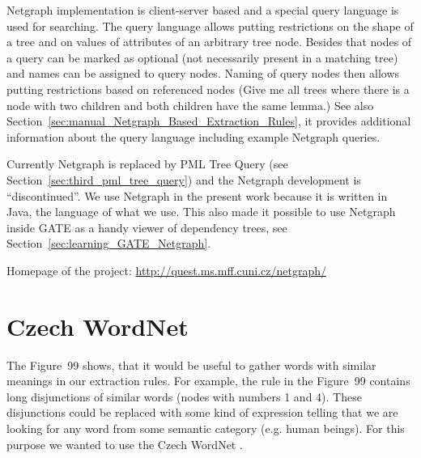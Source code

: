 Netgraph implementation is client-server based and a special query language is used for searching. The query language allows putting restrictions on the shape of a tree and on values of attributes of an arbitrary tree node. Besides that nodes of a query can be marked as optional (not necessarily present in a matching tree) and names can be assigned to query nodes. Naming of query nodes then allows putting restrictions based on referenced nodes (Give me all trees where there is a node with two children and both children have the same lemma.) See also Section~\ref{sec:manual_Netgraph_Based_Extraction_Rules}, it provides additional information about the query language including example Netgraph queries.

Currently Netgraph is replaced by PML Tree Query (see Section~\ref{sec:third_pml_tree_query}) and the Netgraph development is ``discontinued''. We use Netgraph in the present work because it is written in Java, the language of what we use. This also made it possible to use Netgraph inside GATE as a handy viewer of dependency trees, see Section~\ref{sec:learning_GATE_Netgraph}. 

\medskip
Homepage of the project: \url{http://quest.ms.mff.cuni.cz/netgraph/}




\section{Czech WordNet}

The Figure~99 shows, that it would be useful to gather words with similar meanings in our extraction rules. For example, the rule in the Figure~99 contains long disjunctions of similar words (nodes with numbers 1 and 4). These disjunctions could be replaced with some kind of expression telling that we are looking for any word from some semantic category (e.g. human beings). For this purpose we wanted to use the Czech WordNet \citep{biblio:WordNetCZ2004}. 

